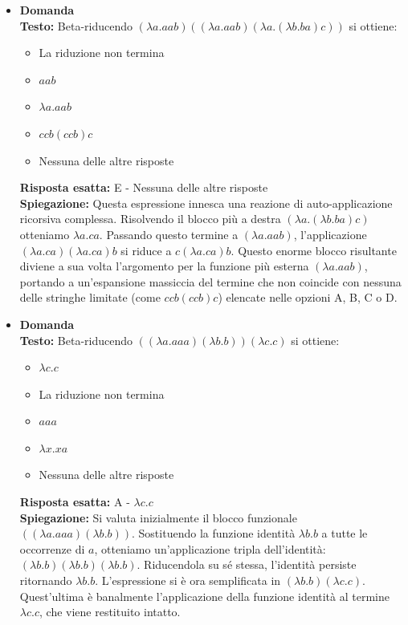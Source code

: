 \documentclass[12pt, a4paper]{article}
\newcounter{domandateoria}
\begin{document}
\begin{itemize}
\newpage

\item {}\textbf{Domanda \thedomandateoria} \\
\textbf{Testo:} Beta-riducendo $(\lambda a.a a b)((\lambda a.a a b)(\lambda a.(\lambda b.b a)c))$ si ottiene:
\begin{itemize}
    \item[A)] La riduzione non termina
    \item[B)] $a a b$
    \item[C)] $\lambda a.a a b$
    \item[D)] $c c b(c c b)c$
    \item[E)] Nessuna delle altre risposte
\end{itemize}
\textbf{Risposta esatta:} E - Nessuna delle altre risposte \\
\textbf{Spiegazione:} Questa espressione innesca una reazione di auto-applicazione ricorsiva complessa. Risolvendo il blocco più a destra $(\lambda a.(\lambda b.b a)c)$ otteniamo $\lambda a.c a$. Passando questo termine a $(\lambda a.a a b)$, l'applicazione $(\lambda a.c a)(\lambda a.c a)b$ si riduce a $c(\lambda a.c a)b$. Questo enorme blocco risultante diviene a sua volta l'argomento per la funzione più esterna $(\lambda a.a a b)$, portando a un'espansione massiccia del termine che non coincide con nessuna delle stringhe limitate (come $c c b(c c b)c$) elencate nelle opzioni A, B, C o D.
\vspace{0.3cm}

\item {}\textbf{Domanda \thedomandateoria} \\
\textbf{Testo:} Beta-riducendo $((\lambda a.a a a) (\lambda b.b))(\lambda c.c)$ si ottiene:
\begin{itemize}
    \item[A)] $\lambda c.c$
    \item[B)] La riduzione non termina
    \item[C)] $a a a$
    \item[D)] $\lambda x.x a$
    \item[E)] Nessuna delle altre risposte
\end{itemize}
\textbf{Risposta esatta:} A - $\lambda c.c$ \\
\textbf{Spiegazione:} Si valuta inizialmente il blocco funzionale $((\lambda a.a a a) (\lambda b.b))$. Sostituendo la funzione identità $\lambda b.b$ a tutte le occorrenze di $a$, otteniamo un'applicazione tripla dell'identità: $(\lambda b.b)(\lambda b.b)(\lambda b.b)$. Riducendola su sé stessa, l'identità persiste ritornando $\lambda b.b$. L'espressione si è ora semplificata in $(\lambda b.b)(\lambda c.c)$. Quest'ultima è banalmente l'applicazione della funzione identità al termine $\lambda c.c$, che viene restituito intatto.
\vspace{0.3cm}


\end{itemize}
\end{document}
